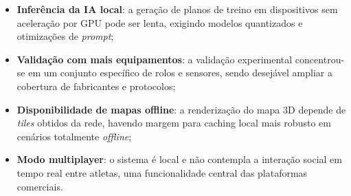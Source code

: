 \begin{itemize}
    \item \textbf{Inferência da IA local}: a geração de planos de treino em
        dispositivos sem aceleração por GPU pode ser lenta, exigindo modelos
        quantizados e otimizações de \textit{prompt};
    \item \textbf{Validação com mais equipamentos}: a validação experimental
        concentrou-se em um conjunto específico de rolos e sensores, sendo
        desejável ampliar a cobertura de fabricantes e protocolos;
    \item \textbf{Disponibilidade de mapas offline}: a renderização do mapa 3D
        depende de \textit{tiles} obtidos da rede, havendo margem para caching
        local mais robusto em cenários totalmente \textit{offline};
    \item \textbf{Modo multiplayer}: o sistema é local e não contempla a
        interação social em tempo real entre atletas, uma funcionalidade
        central das plataformas comerciais.
\end{itemize}
